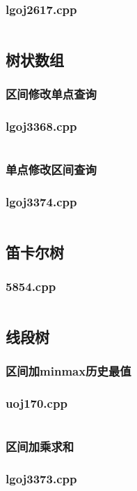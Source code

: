 \documentclass[a4paper,landscape,twocolumn]{article} %
\begin{document}
\subsubsection{lgoj2617.cpp}
\inputminted{c++}{./codes/044}
\subsection{树状数组}
\subsubsection{区间修改单点查询}
\subsubsection{lgoj3368.cpp}
\inputminted{c++}{./codes/045}
\subsubsection{单点修改区间查询}
\subsubsection{lgoj3374.cpp}
\inputminted{c++}{./codes/046}
\subsection{笛卡尔树}
\subsubsection{5854.cpp}
\inputminted{c++}{./codes/047}
\subsection{线段树}
\subsubsection{区间加minmax历史最值}
\subsubsection{uoj170.cpp}
\inputminted{c++}{./codes/048}
\subsubsection{区间加乘求和}
\subsubsection{lgoj3373.cpp}
\inputminted{c++}{./codes/049}
\end{document}

